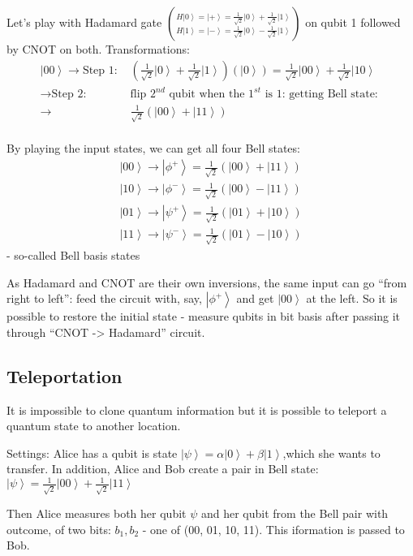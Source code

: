 \documentclass{scrartcl}
\newcommand{\ket}[1]{\left| #1 \right>} %
\begin{document}
Let's play with Hadamard gate $\binom{H\ket0=\ket+=\frac1{\sqrt2}\ket0 +
  \frac1{\sqrt2}\ket1}{H\ket1=\ket-=\frac1{\sqrt2}\ket0 - \frac1{\sqrt2}\ket1}$
on qubit 1 followed by CNOT on both. Transformations:
\begin{equation*} \begin{split} \ket{00} \to \mbox{Step 1: } & (\frac1{\sqrt{2}}
    \ket0 + \frac1{\sqrt{2}} \ket1 ) ( \ket0 ) =
    \frac1{\sqrt{2}} \ket{00} + \frac1{\sqrt{2}} \ket{10} \\
    \to \mbox{Step 2: } & \mbox{flip $2^{nd}$ qubit when the $1^{st}$ is 1: getting Bell state: }\\
    \to &\frac1{\sqrt{2}}(\ket{00} + \ket{11}) \\
  \end{split}\end{equation*}

By playing the input states, we can get all four Bell states:
\begin{align*}
  \ket{00} \to \ket{\phi^+} = \frac1{\sqrt{2}} (\ket{00} + \ket{11})\\
  \ket{10} \to \ket{\phi^-} = \frac1{\sqrt{2}} (\ket{00} - \ket{11})\\
  \ket{01} \to \ket{\psi^+} = \frac1{\sqrt{2}} (\ket{01} + \ket{10})\\
  \ket{11} \to \ket{\psi^-} = \frac1{\sqrt{2}} (\ket{01} - \ket{10})
\end{align*}
- so-called Bell basis states

As Hadamard and CNOT are their own inversions, the same input can go ``from
right to left'': feed the circuit with, say, $\ket{\phi^+}$ and get $\ket{00}$
at the left. So it is possible to restore the initial state - measure qubits in
bit basis after passing it through ``CNOT -> Hadamard'' circuit.

\subsection{Teleportation}
\label{sec:6-3}

It is impossible to clone quantum information but it is possible to teleport a
quantum state to another location.

Settings: Alice has a qubit is state $\ket\psi = \alpha\ket0 + \beta\ket1$,which
she wants to transfer. In addition, Alice and Bob create a pair in Bell state:
$\ket\psi = \frac1{\sqrt{2}} \ket{00} + \frac1{\sqrt{2}}\ket{11}$

Then Alice measures both her qubit $\psi$ and her qubit from the Bell pair with
outcome, of two bits: $b_1, b_2$ - one of (00, 01, 10, 11). This iformation is
passed to Bob.
\end{document}

